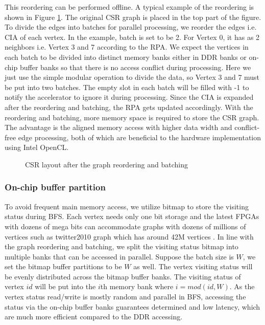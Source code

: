 This reordering can be performed offline.
A typical example of the reordering is shown in Figure \ref{fig:graph-reorder}. 
The original CSR graph is placed in the top part of the figure. 
To divide the edges into batches for parallel processing, we reorder the edges i.e. CIA 
of each vertex. In the example, batch is set to be 2. For Vertex 0, 
it has as 2 neighbors i.e. Vertex 3 and 7 according to the RPA. 
We expect the vertices in each batch to be divided into distinct memory 
banks either in DDR banks or on-chip buffer banks so that there is no 
access conflict during processing. Here we just use the simple modular 
operation to divide the data, so Vertex 3 and 7 must be put into two batches.
The empty slot in each batch will be filled with -1 to notify the accelerator to 
ignore it during processing. Since the CIA is expanded after 
the reordering and batching, the RPA gets updated accordingly.
With the reordering and batching, more memory space is required to store the 
CSR graph. The advantage is the aligned memory access 
with higher data width and conflict-free edge processing, 
both of which are beneficial to the hardware implementation 
using Intel OpenCL.

\begin{figure}
    \caption{CSR layout after the graph reordering and batching}
\label{fig:graph-reorder}
\vspace{-1em}
\end{figure}

\subsubsection{On-chip buffer partition}
To avoid frequent main memory access, we utilize bitmap to store 
the visiting status during BFS. Each vertex needs only one bit 
storage and the latest FPGAs with dozens of mega bits can accommodate 
graphs with dozens of millions of vertices such as twitter2010 graph which has 
around 42M vertices \cite{boldi2011layered}. In line with the graph reordering 
and batching, we split the visiting status bitmap into multiple banks that 
can be accessed in parallel. Suppose the batch size is $W$, we set the 
bitmap buffer partitions to be $W$ as well. The vertex visiting status will 
be evenly distributed across the bitmap buffer banks. The visiting status of 
vertex $id$ will be put into the $i$th memory bank where $i = mod(id, W)$.
As the vertex status read/write is mostly random and parallel in BFS, 
accessing the status via the on-chip buffer banks guarantees determined 
and low latency, which are much  more efficient compared to the DDR 
accessing. 

